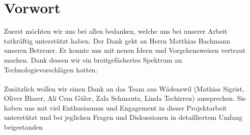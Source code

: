 \documentclass[../main.tex]{subfiles}
\begin{document}
	\section*{Vorwort}
	Zuerst möchten wir uns bei allen bedanken, welche uns bei unserer Arbeit tatkräftig unterstützt haben. Der Dank geht an Herrn Matthias Bachmann unseren Betreuer. Er konnte uns mit neuen Ideen und Vorgehensweisen vertraut machen. Dank dessen wir ein breitgefächertes Spektrum an Technologievorschlägen hatten. \\
	\\
	Zusätzlich wollen wir einen Dank an das Team aus Wädenswil (Mathias Sigrist, Oliver Blaser, Ali Cem Güler, Zala Schmautz, Linda Tschirren) aussprechen. Sie haben uns mit viel Enthusiasmus und Engagement in dieser Projektarbeit unterstützt und bei jeglichen Fragen und Diskussionen in detailliertem Umfang beigestanden
\end{document}
